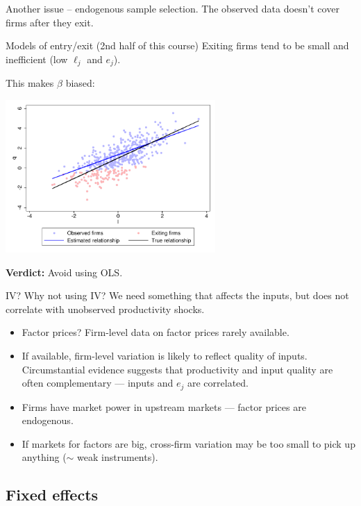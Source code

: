 \begin{frame}{}
	Another issue -- endogenous sample selection. The observed data doesn't cover firms after they exit.
	\begin{block}{Models of entry/exit (2nd half of this course)}
		Exiting firms tend to be small and inefficient (low $\ell_j$ and $e_j$).
			
		This makes $\widehat{\beta}$ biased:
		\begin{center}
			\includegraphics[width = 0.6\textwidth]{Figures/selection_bias.pdf}
		\end{center}
	\end{block}
	\textbf{Verdict:} Avoid using OLS.
\end{frame}

\begin{frame}{IV?}
Why not using IV? We need something that affects the inputs, but does not correlate with unobserved productivity shocks.
\begin{itemize}
	\item{Factor prices? Firm-level data on factor prices rarely available.}
	\item{If available, firm-level variation is likely to reflect quality of inputs. Circumstantial evidence suggests that productivity and input quality are often complementary --- inputs and $e_j$ are correlated.}
	\item{Firms have market power in upstream markets --- factor prices are endogenous.}
	\item{If markets for factors are big, cross-firm variation may be too small to pick up anything ($\sim$ weak instruments).}
\end{itemize}
\end{frame}

\subsection{Fixed effects}

